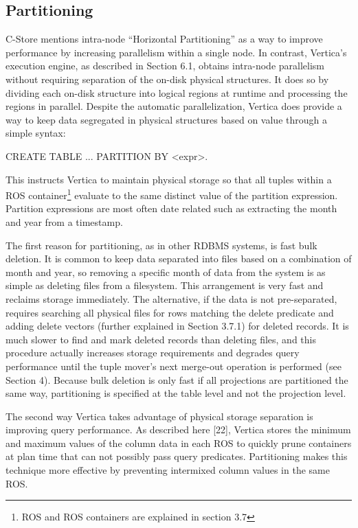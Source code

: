 \documentclass[a4paper,12pt,notitlepage,twoside,openright]{article}
\begin{document}
\hypertarget{partitioning}{%
\subsection{Partitioning}\label{partitioning}}

C-Store mentions intra-node ``Horizontal Partitioning'' as a way to
improve performance by increasing parallelism within a single node. In
contrast, Vertica's execution engine, as described in Section 6.1,
obtains intra-node parallelism without requiring separation of the
on-disk physical structures. It does so by dividing each on-disk
structure into logical regions at runtime and processing the regions in
parallel. Despite the automatic parallelization, Vertica does provide a
way to keep data segregated in physical structures based on value
through a simple syntax:

CREATE TABLE ... PARTITION BY \textless expr\textgreater.

This instructs Vertica to maintain physical storage so that all tuples
within a ROS container\footnote{ROS and ROS containers are explained in
  section 3.7} evaluate to the same distinct value of the partition
expression. Partition expressions are most often date related such as
extracting the month and year from a timestamp.

The first reason for partitioning, as in other RDBMS systems, is fast
bulk deletion. It is common to keep data separated into files based on a
combination of month and year, so removing a specific month of data from
the system is as simple as deleting files from a filesystem. This
arrangement is very fast and reclaims storage immediately. The
alternative, if the data is not pre-separated, requires searching all
physical files for rows matching the delete predicate and adding delete
vectors (further explained in Section 3.7.1) for deleted records. It is
much slower to find and mark deleted records than deleting files, and
this procedure actually increases storage requirements and degrades
query performance until the tuple mover's next merge-out operation is
performed (see Section 4). Because bulk deletion is only fast if all
projections are partitioned the same way, partitioning is specified at
the table level and not the projection level.

The second way Vertica takes advantage of physical storage separation is
improving query performance. As described here {[}22{]}, Vertica stores
the minimum and maximum values of the column data in each ROS to quickly
prune containers at plan time that can not possibly pass query
predicates. Partitioning makes this technique more effective by
preventing intermixed column values in the same ROS.
\end{document}
